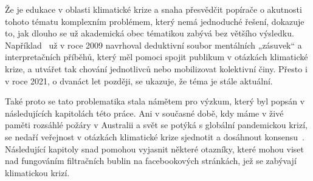    Že je edukace v oblasti klimatické krize a snaha přesvědčit popírače o akutnosti tohoto tématu komplexním problémem, který nemá jednoduché řešení, dokazuje to, jak dlouho se už akademická obec tématikou zabývá bez většího výsledku. Například~\cite{nisbet2009communicating} už v roce 2009 navrhoval deduktivní soubor mentálních „zásuvek“ a interpretačních příběhů, který měl pomoci spojit publikum v otáz\-kách klimatické krize, a utvářet tak chování jednotlivců nebo mobilizovat kolektivní činy. Přesto i v roce 2021, o dvanáct let později, se ukazuje, že téma je stále aktuální. 
    
    Také proto se tato problematika stala námětem pro výzkum, který byl popsán v následujících kapitolách této práce. Ani v současné době, kdy máme v živé paměti rozsáhlé požáry v Australii a svět se potýká s globální pandemickou krizí, se nedaří veřejnost v otázkách klimatické krize sjednotit a dosáhnout konsensu~\citep{tarabay10,leyen_ghebreyesus_2020}. Následující kapitoly snad pomohou vyjasnit některé otazníky, které mohou viset nad fungováním filtračních bublin na facebookových stránkách, jež se zabývají klimatickou krizí.



